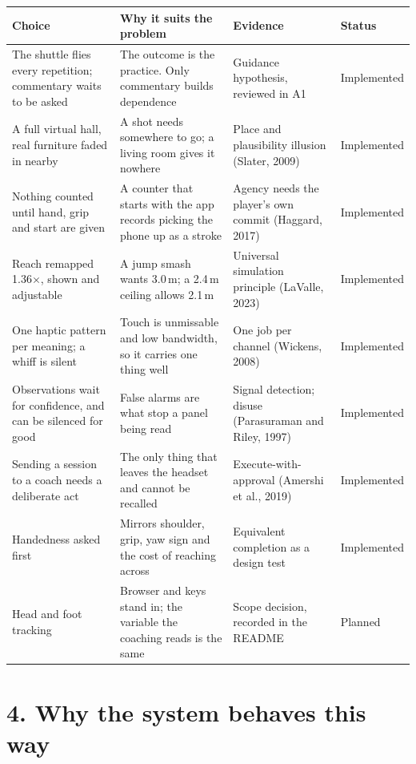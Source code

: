 \documentclass[11pt,a4paper]{article}
\begin{document}
\begin{table}[H]\small
\begin{tabularx}{\textwidth}{@{}p{3.05cm}YY p{1.85cm}@{}}
\toprule
\textbf{Choice} & \textbf{Why it suits the problem} & \textbf{Evidence} & \textbf{Status}\\
\midrule
The shuttle flies every repetition; commentary waits to be asked &
The outcome is the practice. Only commentary builds dependence &
Guidance hypothesis, reviewed in A1 &
Implemented\\
\addlinespace
A full virtual hall, real furniture faded in nearby &
A shot needs somewhere to go; a living room gives it nowhere &
Place and plausibility illusion (Slater, 2009) &
Implemented\\
\addlinespace
Nothing counted until hand, grip and start are given &
A counter that starts with the app records picking the phone up as a stroke &
Agency needs the player's own commit (Haggard, 2017) &
Implemented\\
\addlinespace
Reach remapped 1.36$\times$, shown and adjustable &
A jump smash wants 3.0\,m; a 2.4\,m ceiling allows 2.1\,m &
Universal simulation principle (LaValle, 2023) &
Implemented\\
\addlinespace
One haptic pattern per meaning; a whiff is silent &
Touch is unmissable and low bandwidth, so it carries one thing well &
One job per channel (Wickens, 2008) &
Implemented\\
\addlinespace
Observations wait for confidence, and can be silenced for good &
False alarms are what stop a panel being read &
Signal detection; disuse (Parasuraman and Riley, 1997) &
Implemented\\
\addlinespace
Sending a session to a coach needs a deliberate act &
The only thing that leaves the headset and cannot be recalled &
Execute-with-approval (Amershi et al., 2019) &
Implemented\\
\addlinespace
Handedness asked first &
Mirrors shoulder, grip, yaw sign and the cost of reaching across &
Equivalent completion as a design test &
Implemented\\
\addlinespace
Head and foot tracking &
Browser and keys stand in; the variable the coaching reads is the same &
Scope decision, recorded in the README &
Planned\\
\bottomrule
\end{tabularx}
\end{table}

\section*{4. Why the system behaves this way}
\end{document}
